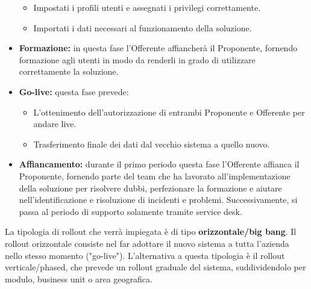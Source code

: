 \begin{itemize}
\begin{itemize}
                    \item Impostati i profili utenti e assegnati i privilegi correttamente.
                    \item Importati i dati necessari al funzionamento della soluzione.
                \end{itemize}
                \item \textbf{Formazione:} in questa fase l'Offerente affiancherà il Proponente, fornendo formazione agli utenti in modo da renderli in grado di utilizzare correttamente la soluzione.
                \item \textbf{Go-live:} questa fase prevede:
                \begin{itemize}
                	\item  L'ottenimento dell'autorizzazione di entrambi Proponente e Offerente per andare live.
                    \item Trasferimento finale dei dati dal vecchio sistema a quello nuovo.
                \end{itemize}
                \item \textbf{Affiancamento:} durante il primo periodo questa fase l'Offerente affianca il Proponente, fornendo parte del team che ha lavorato all'implementazione della soluzione per risolvere dubbi, perfezionare la formazione e aiutare nell'identificazione e risoluzione di incidenti e problemi. Successivamente, si passa al periodo di supporto solamente tramite service desk.
            \end{itemize}
            

            La tipologia di rollout che verrà impiegata è di tipo \textbf{orizzontale/big bang}. Il rollout orizzontale consiste nel far adottare il nuovo sistema a tutta l'azienda nello stesso momento ("go-live"). L'alternativa a questa tipologia è il rollout verticale/phased, che prevede un rollout graduale del sistema, suddividendolo per modulo, business unit o area geografica.


